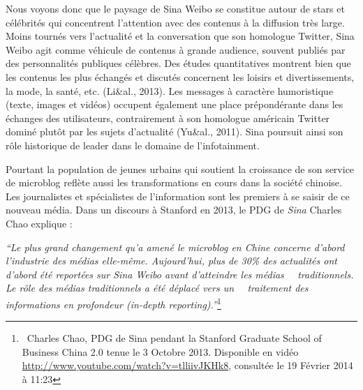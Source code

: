 \bigskip

{\color{black}
Nous voyons donc que le paysage de Sina Weibo se constitue autour de stars et c\'el\'ebrit\'es qui concentrent
l'attention avec des contenus \`a la diffusion tr\`es large. Moins tourn\'es vers l'actualit\'e et la conversation que
son homologue Twitter, Sina Weibo agit comme v\'ehicule de contenus \`a grande audience, souvent publi\'es par des
personnalit\'es publiques c\'el\`ebres. Des \'etudes quantitatives montrent bien que les contenus les plus \'echang\'es
et discut\'es concernent les loisirs et divertissements, la mode, la sant\'e, etc. (Li\&al., 2013). Les messages \`a
caract\`ere humoristique (texte, images et vid\'eos) occupent \'egalement une place pr\'epond\'erante dans les
\'echanges des utilisateurs, contrairement \`a son homologue am\'ericain Twitter domin\'e plut\^ot par les sujets
d'actualit\'e (Yu\&al., 2011). Sina poursuit ainsi son r\^ole historique de leader dans le domaine de l'infotainment. }


\bigskip

{\color{black}
Pourtant la population de jeunes urbains qui soutient la croissance de son service de microblog refl\`ete aussi les
transformations en cours dans la soci\'et\'e chinoise. Les journalistes et sp\'ecialistes de l'information sont les
premiers \`a se saisir de ce nouveau m\'edia. Dans un discours \`a Stanford en 2013, le PDG de \textit{Sina }Charles
Chao explique : }


\bigskip

{\color{black}
\textit{{}``}\textit{Le plus grand changement qu}\textit{{}'}\textit{a amen\'e le microblog en Chine concerne
d}\textit{{}'}\textit{abord l}\textit{{}'}\textit{industrie des m\'edias elle-m\^eme. Aujourd}\textit{{}'}\textit{hui,
plus de 30\% des actualit\'es ont d}\textit{{}'}\textit{abord \'et\'e report\'ees sur Sina Weibo avant d'atteindre les
m\'edias \ \ traditionnels. Le r\^ole des m\'edias traditionnels a \'et\'e d\'eplac\'e vers un \ \ traitement des
informations en profondeur (in-depth reporting).''}\footnote{\ Charles Chao, PDG de Sina pendant la Stanford Graduate
School of Business China 2.0 tenue le 3 Octobre 2013. Disponible en vid\'eo
\url{http://www.youtube.com/watch?v=tlliivJKHk8}, consult\'ee le 19 F\'evrier 2014 \`a 11:23}}


\bigskip

